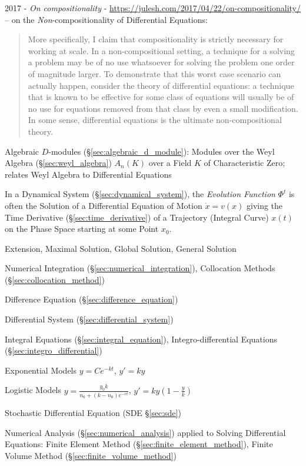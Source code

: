 {2017 - \emph{On compositionality} -
\url{https://julesh.com/2017/04/22/on-compositionality/} --
on the \emph{Non}-compositionality of Differential Equations:
\begin{quote}
  More specifically, I claim that compositionality is strictly necessary
  for working at scale. In a non-compositional setting, a technique for a
  solving a problem may be of no use whatsoever for solving the problem one
  order of magnitude larger. To demonstrate that this worst case scenario can
  actually happen, consider the theory of differential equations: a technique
  that is known to be effective for some class of equations will usually be of
  no use for equations removed from that class by even a small modification. In
  some sense, differential equations is the ultimate non-compositional theory.
\end{quote}

\fist Algebraic $D$-modules (\S\ref{sec:algebraic_d_module}): Modules over the
Weyl Algebra (\S\ref{sec:weyl_algebra}) $A_n(K)$ over a Field $K$ of
Characteristic Zero; relates Weyl Algebra to Differential Equations

In a Dynamical System (\S\ref{sec:dynamical_system}), the \emph{Evolution
  Function} $\Phi^t$ is often the Solution of a Differential Equation of Motion
$\dot{x} = v(x)$ giving the Time Derivative (\S\ref{sec:time_derivative}) of a
Trajectory (Integral Curve) $x(t)$ on the Phase Space starting at some Point
$x_0$.

Extension, Maximal Solution, Global Solution, General Solution

\fist Numerical Integration (\S\ref{sec:numerical_integration}), Collocation
Methods (\S\ref{sec:collocation_method})

\fist Difference Equation (\S\ref{sec:difference_equation})

\fist Differential System (\S\ref{sec:differential_system})

\fist Integral Equations (\S\ref{sec:integral_equation}), Integro-differential
Equations (\S\ref{sec:integro_differential})

Exponential Models $y = Ce^{-kt}$, $y' = ky$

Logistic Models $y = \frac{y_0 k}{n_0 + (k-n_0)e^{-rt}}$,
  $y' = ky (1 - \frac{y}{k})$

\fist Stochastic Differential Equation (SDE \S\ref{sec:sde})

\fist Numerical Analysis (\S\ref{sec:numerical_analysis}) applied to Solving
Differential Equations: Finite Element Method
(\S\ref{sec:finite_element_method}), Finite Volume Method
(\S\ref{sec:finite_volume_method})



}
